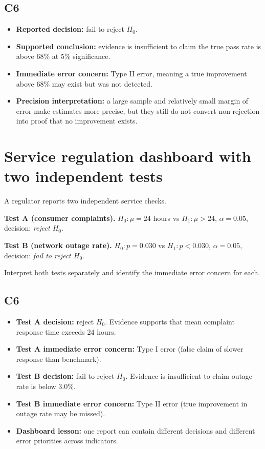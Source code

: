 	\subsection*{C6}
	\begin{itemize}
		\item \textbf{Reported decision:} fail to reject \(H_0\).
		\item \textbf{Supported conclusion:} evidence is insufficient to claim the true pass rate is above 68\% at 5\% significance.
		\item \textbf{Immediate error concern:} Type II error, meaning a true improvement above 68\% may exist but was not detected.
		\item \textbf{Precision interpretation:} a large sample and relatively small margin of error make estimates more precise, but they still do not convert non-rejection into proof that no improvement exists.
	\end{itemize}
	
	\section{Service regulation dashboard with two independent tests}
	A regulator reports two independent service checks.
	
	\textbf{Test A (consumer complaints).} \(H_0\colon \mu=24\) hours vs \(H_1\colon \mu>24\), \(\alpha=0.05\), decision: \textit{reject \(H_0\)}.
	
	\textbf{Test B (network outage rate).} \(H_0\colon p=0.030\) vs \(H_1\colon p<0.030\), \(\alpha=0.05\), decision: \textit{fail to reject \(H_0\)}.
	
	Interpret both tests separately and identify the immediate error concern for each.
	
	\begin{center}
		\hspace{0.8cm}
	\end{center}
	
	\subsection*{C6}
	\begin{itemize}
		\item \textbf{Test A decision:} reject \(H_0\). Evidence supports that mean complaint response time exceeds 24 hours.
		\item \textbf{Test A immediate error concern:} Type I error (false claim of slower response than benchmark).
		\item \textbf{Test B decision:} fail to reject \(H_0\). Evidence is insufficient to claim outage rate is below 3.0\%.
		\item \textbf{Test B immediate error concern:} Type II error (true improvement in outage rate may be missed).
		\item \textbf{Dashboard lesson:} one report can contain different decisions and different error priorities across indicators.
	\end{itemize}
	
